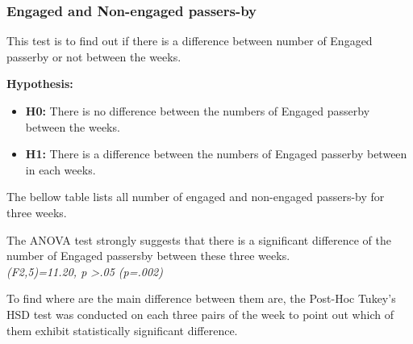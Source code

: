 \subsubsection {Engaged and Non-engaged passers-by}
This test is to find out if there is a difference between number of Engaged passerby or not between the weeks.

\textbf{Hypothesis: }
\begin{itemize}
\item \textbf{H0:} There is no difference between the numbers of Engaged passerby between the weeks.
\item \textbf{H1:} There is a difference between the numbers of Engaged passerby between in each weeks.
\end{itemize}

The bellow table lists all number of engaged and non-engaged passers-by for three weeks.


\begin{table}[H]
\caption{Number of engaged passers-by in three weeks}
\label{tab:engagedofthreeweeks}
\centering
{}
\end{table}

The ANOVA test strongly suggests that there is a significant difference of the number of Engaged passersby between these three weeks.\\
 \emph{(F2,5)=11.20, p >.05 (p=.002)}

To find where are the main difference between them are, the Post-Hoc Tukey’s HSD test was conducted on each three pairs of the week to point out which of them exhibit statistically significant difference. 


